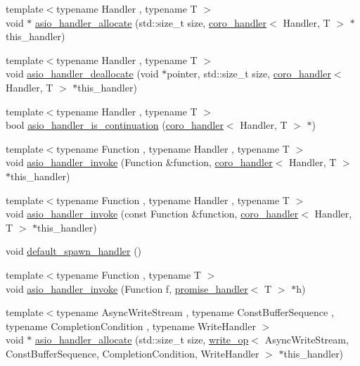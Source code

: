 \begin{DoxyCompactItemize}
\item 
{\footnotesize template$<$typename Handler , typename T $>$ }\\void $\ast$ \hyperlink{namespaceasio_1_1detail_ab1108501b67afc279c75d59be638c4a5}{asio\+\_\+handler\+\_\+allocate} (std\+::size\+\_\+t size, \hyperlink{classasio_1_1detail_1_1coro__handler}{coro\+\_\+handler}$<$ Handler, T $>$ $\ast$this\+\_\+handler)
\item 
{\footnotesize template$<$typename Handler , typename T $>$ }\\void \hyperlink{namespaceasio_1_1detail_a22c0da83e74c079f3d3bbe2cb5c98b7e}{asio\+\_\+handler\+\_\+deallocate} (void $\ast$pointer, std\+::size\+\_\+t size, \hyperlink{classasio_1_1detail_1_1coro__handler}{coro\+\_\+handler}$<$ Handler, T $>$ $\ast$this\+\_\+handler)
\item 
{\footnotesize template$<$typename Handler , typename T $>$ }\\bool \hyperlink{namespaceasio_1_1detail_a799841666817a43ef0ce6648cf11b591}{asio\+\_\+handler\+\_\+is\+\_\+continuation} (\hyperlink{classasio_1_1detail_1_1coro__handler}{coro\+\_\+handler}$<$ Handler, T $>$ $\ast$)
\item 
{\footnotesize template$<$typename Function , typename Handler , typename T $>$ }\\void \hyperlink{namespaceasio_1_1detail_a28d0fdad5eaeeda32b6c5190739a30c9}{asio\+\_\+handler\+\_\+invoke} (Function \&function, \hyperlink{classasio_1_1detail_1_1coro__handler}{coro\+\_\+handler}$<$ Handler, T $>$ $\ast$this\+\_\+handler)
\item 
{\footnotesize template$<$typename Function , typename Handler , typename T $>$ }\\void \hyperlink{namespaceasio_1_1detail_aa00c299e6d5a33f25e3e21f674b7e407}{asio\+\_\+handler\+\_\+invoke} (const Function \&function, \hyperlink{classasio_1_1detail_1_1coro__handler}{coro\+\_\+handler}$<$ Handler, T $>$ $\ast$this\+\_\+handler)
\item 
void \hyperlink{namespaceasio_1_1detail_ae52410f9602d05f98a368de78e61954e}{default\+\_\+spawn\+\_\+handler} ()
\item 
{\footnotesize template$<$typename Function , typename T $>$ }\\void \hyperlink{namespaceasio_1_1detail_a4af2e428680aed7df4d64d8d4eb54cbf}{asio\+\_\+handler\+\_\+invoke} (Function f, \hyperlink{classasio_1_1detail_1_1promise__handler}{promise\+\_\+handler}$<$ T $>$ $\ast$h)
\item 
{\footnotesize template$<$typename Async\+Write\+Stream , typename Const\+Buffer\+Sequence , typename Completion\+Condition , typename Write\+Handler $>$ }\\void $\ast$ \hyperlink{namespaceasio_1_1detail_a25e2b37b5aa0054f1fee6e86e1afce73}{asio\+\_\+handler\+\_\+allocate} (std\+::size\+\_\+t size, \hyperlink{classasio_1_1detail_1_1write__op}{write\+\_\+op}$<$ Async\+Write\+Stream, Const\+Buffer\+Sequence, Completion\+Condition, Write\+Handler $>$ $\ast$this\+\_\+handler)

\end{DoxyCompactItemize}
